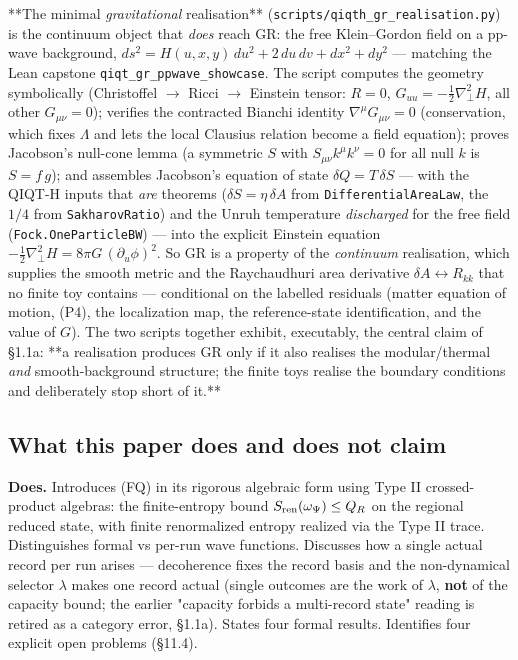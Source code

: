 \documentclass[11pt,a4paper]{article}
\begin{document}
**The minimal \emph{gravitational} realisation** (\texttt{scripts/qiqth\_gr\_realisation.py}) is the continuum object that \emph{does} reach GR: the free Klein–Gordon field on a pp-wave background, $ds^2=H(u,x,y)\,du^2+2\,du\,dv+dx^2+dy^2$ — matching the Lean capstone \texttt{qiqt\_gr\_ppwave\_showcase}. The script computes the geometry symbolically (Christoffel $\to$ Ricci $\to$ Einstein tensor: $R=0$, $G_{uu}=-\tfrac12\nabla^2_\perp H$, all other $G_{\mu\nu}=0$); verifies the contracted Bianchi identity $\nabla^\mu G_{\mu\nu}=0$ (conservation, which fixes $\Lambda$ and lets the local Clausius relation become a field equation); proves Jacobson's null-cone lemma (a symmetric $S$ with $S_{\mu\nu}k^\mu k^\nu=0$ for all null $k$ is $S=f\,g$); and assembles Jacobson's equation of state $\delta Q=T\,\delta S$ — with the QIQT-H inputs that \emph{are} theorems ($\delta S=\eta\,\delta A$ from \texttt{DifferentialAreaLaw}, the $1/4$ from \texttt{SakharovRatio}) and the Unruh temperature \emph{discharged} for the free field (\texttt{Fock.OneParticleBW}) — into the explicit Einstein equation $-\tfrac12\nabla^2_\perp H = 8\pi G\,(\partial_u\phi)^2$. So GR is a property of the \emph{continuum} realisation, which supplies the smooth metric and the Raychaudhuri area derivative $\delta A\leftrightarrow R_{kk}$ that no finite toy contains — conditional on the labelled residuals (matter equation of motion, (P4), the localization map, the reference-state identification, and the value of $G$). The two scripts together exhibit, executably, the central claim of §1.1a: **a realisation produces GR only if it also realises the modular/thermal \emph{and} smooth-background structure; the finite toys realise the boundary conditions and deliberately stop short of it.**

\subsection{What this paper does and does not claim}

\textbf{Does.} Introduces (FQ) in its rigorous algebraic form using Type II crossed-product algebras: the finite-entropy bound $S_{\rm ren}(\omega_\Psi) \le Q_R$ on the regional reduced state, with finite renormalized entropy realized via the Type II trace. Distinguishes formal vs per-run wave functions. Discusses how a single actual record per run arises — decoherence fixes the record basis and the non-dynamical selector $\lambda$ makes one record actual (single outcomes are the work of $\lambda$, \textbf{not} of the capacity bound; the earlier "capacity forbids a multi-record state" reading is retired as a category error, §1.1a). States four formal results. Identifies four explicit open problems (§11.4).
\end{document}
